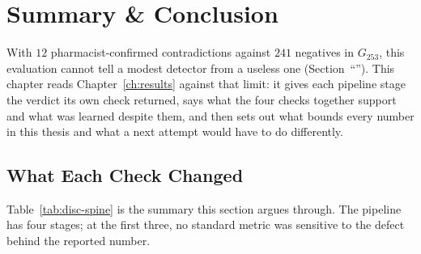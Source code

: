 %

\chapter{Summary \& Conclusion}
\label{ch:discussion}
\label{ch:conclusion}

 With $12$ pharmacist-confirmed contradictions against
$241$ negatives in $G_{253}$, this evaluation cannot tell a modest detector from a
useless one (Section~``''). This chapter reads Chapter~\ref{ch:results}
against that limit: it gives each pipeline stage the verdict its own check returned, says what the
four checks together support and what was learned despite them, and then sets out what bounds every
number in this thesis and what a next attempt would have to do differently.

\section{What Each Check Changed}
\label{sec:disc-spine}

Table~\ref{tab:disc-spine} is the summary this section argues through. The
pipeline has four stages; at the first three, no standard metric was sensitive to
the defect behind the reported number. 

